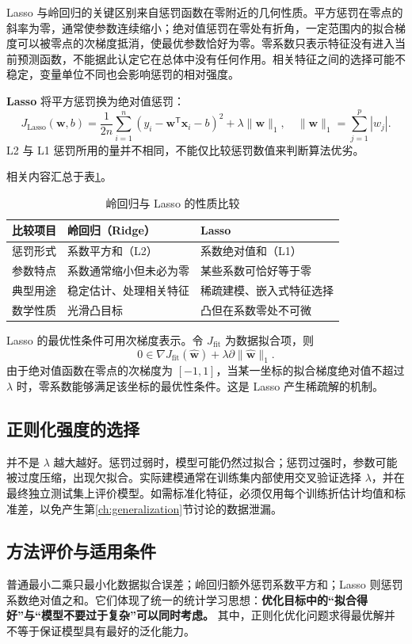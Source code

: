 Lasso 与岭回归的关键区别来自惩罚函数在零附近的几何性质。平方惩罚在零点的斜率为零，通常使参数连续缩小；绝对值惩罚在零处有折角，一定范围内的拟合梯度可以被零点的次梯度抵消，使最优参数恰好为零。零系数只表示特征没有进入当前预测函数，不能据此认定它在总体中没有任何作用。相关特征之间的选择可能不稳定，变量单位不同也会影响惩罚的相对强度。

\textbf{Lasso} 将平方惩罚换为绝对值惩罚：
\begin{equation}\label{eq:lasso-objective}
\boxed{J_{\mathrm{Lasso}}(\boldsymbol w,b)=
\frac1{2n}\sum_{i=1}^{n}(y_i-\boldsymbol w^{\mathsf T}\boldsymbol x_i-b)^2+
\lambda\|\boldsymbol w\|_1,\quad
\|\boldsymbol w\|_1=\sum_{j=1}^{p}|w_j|.}
\end{equation}
L2 与 L1 惩罚所用的量并不相同，不能仅比较惩罚数值来判断算法优劣。

相关内容汇总于表\ref{tab:ridge-lasso}。
\begin{table}[htbp]\centering
\caption{岭回归与 Lasso 的性质比较}\label{tab:ridge-lasso}
\begin{tabularx}{\textwidth}{p{28mm}XX}\toprule
比较项目&岭回归（Ridge）&Lasso\\\midrule
惩罚形式&系数平方和（L2）&系数绝对值和（L1）\\
参数特点&系数通常缩小但未必为零&某些系数可恰好等于零\\
典型用途&稳定估计、处理相关特征&稀疏建模、嵌入式特征选择\\
数学性质&光滑凸目标&凸但在系数零处不可微\\\bottomrule
\end{tabularx}
\end{table}

Lasso 的最优性条件可用次梯度表示。令 $J_{\mathrm{fit}}$ 为数据拟合项，则
\[
0\in \nabla J_{\mathrm{fit}}(\hat{\boldsymbol w})+\lambda\partial\|\hat{\boldsymbol w}\|_1.
\]
由于绝对值函数在零点的次梯度为 $[-1,1]$，当某一坐标的拟合梯度绝对值不超过 $\lambda$ 时，零系数能够满足该坐标的最优性条件。这是 Lasso 产生稀疏解的机制。

\subsection{正则化强度的选择}

并不是 $\lambda$ 越大越好。惩罚过弱时，模型可能仍然过拟合；惩罚过强时，参数可能被过度压缩，出现欠拟合。实际建模通常在训练集内部使用交叉验证选择 $\lambda$，并在最终独立测试集上评价模型\cite[第5章]{james2023}。如需标准化特征，必须仅用每个训练折估计均值和标准差，以免产生第\ref{ch:generalization}节讨论的数据泄漏。

\subsection{方法评价与适用条件}

普通最小二乘只最小化数据拟合误差；岭回归额外惩罚系数平方和；Lasso 则惩罚系数绝对值之和。它们体现了统一的统计学习思想：\textbf{优化目标中的“拟合得好”与“模型不要过于复杂”可以同时考虑。} 其中，正则化优化问题求得最优解并不等于保证模型具有最好的泛化能力。

